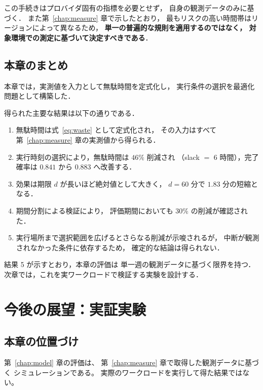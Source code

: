 \documentclass[11pt,a4paper]{ltjsreport}
\begin{document}
この手続きはプロバイダ固有の指標を必要とせず，
自身の観測データのみに基づく．
また第~\ref{chap:measure} 章で示したとおり，
最もリスクの高い時間帯はリージョンによって異なるため，
\textbf{単一の普遍的な規則を適用するのではなく，
対象環境での測定に基づいて決定すべきである}．

\section{本章のまとめ}

本章では，実測値を入力として無駄時間を定式化し，
実行条件の選択を最適化問題として構築した．

得られた主要な結果は以下の通りである．

\begin{enumerate}
  \item 無駄時間は式~\eqref{eq:waste} として定式化され，
        その入力はすべて第~\ref{chap:measure} 章の実測値から得られる．
  \item 実行時刻の選択により，無駄時間は $46\%$ 削減され
        （slack $=$ 6 時間），完了確率は $0.841$ から $0.883$ へ改善する．
  \item 効果は期限 $d$ が長いほど絶対値として大きく，
        $d = 60$ 分で $1.83$ 分の短縮となる．
  \item 期間分割による検証により，
        評価期間においても $30\%$ の削減が確認された．
  \item 実行場所まで選択範囲を広げるとさらなる削減が示唆されるが，
        中断が観測されなかった条件に依存するため，
        確定的な結論は得られない．
\end{enumerate}

結果 5 が示すとおり，本章の評価は
単一週の観測データに基づく限界を持つ．
次章では，これを実ワークロードで検証する実験を設計する．

\chapter{今後の展望：実証実験}
\label{chap:future}

\section{本章の位置づけ}

第~\ref{chap:model} 章の評価は、
第~\ref{chap:measure} 章で取得した観測データに基づく
シミュレーションである。
実際のワークロードを実行して得た結果ではない。
\end{document}

